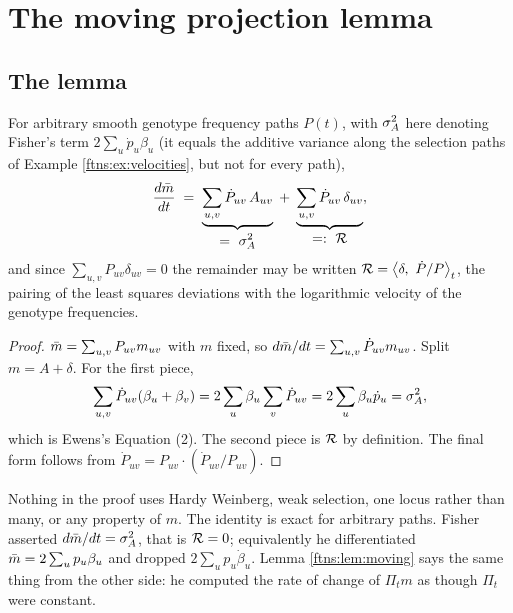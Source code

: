\section{The moving projection lemma}
\label{ftns:sec:lemma}

\subsection{The lemma}

\begin{lemma}
\label{ftns:lem:moving}
For arbitrary smooth genotype frequency paths $P(t)$, with $\sigma^{2}_{A}$ here denoting Fisher's term $2\sum_u\dot p_u\beta_u$ (it equals the additive variance along the selection paths of Example \ref{ftns:ex:velocities}, but not for every path),
\begin{equation}
\frac{d\bar{m}}{dt}
\;=\;
\underbrace{\sum_{u,v}\dot P_{uv}\,A_{uv}}_{\displaystyle =\ \sigma^{2}_{A}}
\;+\;
\underbrace{\sum_{u,v}\dot P_{uv}\,\delta_{uv}}_{\displaystyle =:\ \mathcal{R}} ,
\label{ftns:eq:lemma}
\end{equation}
and since $\sum_{u,v}P_{uv}\delta_{uv}=0$ the remainder may be written
$\mathcal{R}=\big\langle \delta,\ \dot P/P\big\rangle_t$, the pairing of the least squares deviations with
the logarithmic velocity of the genotype frequencies.
\end{lemma}

\begin{proof}
$\bar{m}=\sum_{u,v}P_{uv}m_{uv}$ with $m$ fixed, so $d\bar{m}/dt=\sum_{u,v}\dot P_{uv}m_{uv}$. Split
$m=A+\delta$. For the first piece,
\[
\sum_{u,v}\dot P_{uv}(\beta_u+\beta_v) = 2\sum_u\beta_u\sum_v\dot P_{uv} = 2\sum_u\beta_u\dot p_u
=\sigma^{2}_{A} ,
\]
which is Ewens's Equation (2). The second piece is $\mathcal{R}$ by definition. The final form follows from
$\dot P_{uv}=P_{uv}\cdot(\dot P_{uv}/P_{uv})$.
\end{proof}

Nothing in the proof uses Hardy Weinberg, weak selection, one locus rather than many, or any
property of $m$. The identity is exact for arbitrary paths. Fisher asserted $d\bar{m}/dt=\sigma^{2}_{A}$, that
is $\mathcal{R}=0$; equivalently he differentiated $\bar{m}=2\sum_up_u\beta_u$ and dropped
$2\sum_up_u\dot\beta_u$. Lemma \ref{ftns:lem:moving} says the same thing from the other side: he
computed the rate of change of $\Pi_tm$ as though $\Pi_t$ were constant.

